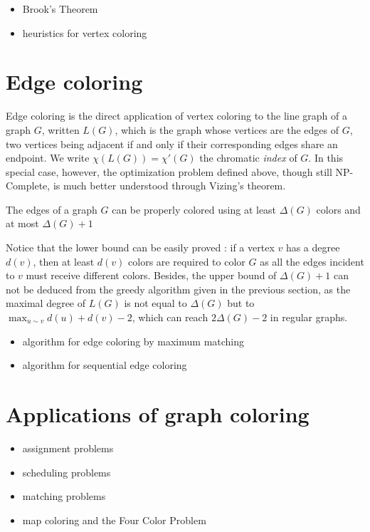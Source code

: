 \begin{itemize}
\item Brook's Theorem
\item heuristics for vertex coloring
\end{itemize}



\section{Edge coloring}

Edge coloring is the direct application of vertex coloring to the line graph of a graph $G$, written $L(G)$, which is the graph whose vertices are the edges of $G$, two vertices being adjacent if and only if their corresponding edges share an endpoint. We write $\chi(L(G)) = \chi'(G)$ the chromatic {\it index} of $G$. In this special case, however, the optimization problem defined above, though still NP-Complete, is much better understood through Vizing's theorem.

\begin{theorem}[Vizing]
The edges of a graph $G$ can be properly colored using at least $\Delta(G)$ colors and at most $\Delta(G)+1$
\end{theorem}
Notice that the lower bound can be easily proved : if a vertex $v$ has a degree $d(v)$, then at least $d(v)$ colors are required to color $G$ as all the edges incident to $v$ must receive different colors. Besides, the upper bound of $\Delta(G)+1$ can not be deduced from the greedy algorithm given in the previous section, as the maximal degree of $L(G)$ is not equal to $\Delta(G)$ but to $\displaystyle \max_{u\sim v}d(u)+d(v)-2$, which can reach $2\Delta(G)-2$ in regular graphs.


\begin{itemize}
\item algorithm for edge coloring by maximum matching
\item algorithm for sequential edge coloring
\end{itemize}



\section{Applications of graph coloring}

\begin{itemize}
\item assignment problems

\item scheduling problems

\item matching problems

\item map coloring and the Four Color Problem
\end{itemize}
